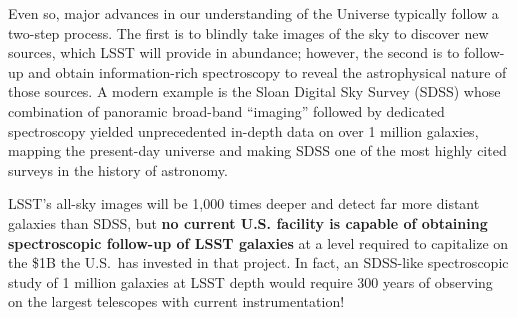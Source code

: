 \documentclass[oneside,11pt]{amsart}
\begin{document}


Even so, major advances in our understanding of the Universe typically
follow a two-step process.  The first is to blindly take images of the
sky to discover new sources, which LSST will provide in abundance;
however, the second is to follow-up and obtain information-rich
spectroscopy to reveal the astrophysical nature of those sources.  A
modern example is the Sloan Digital Sky Survey (SDSS) whose combination
of panoramic broad-band ``imaging'' followed by dedicated spectroscopy
yielded unprecedented in-depth data on over 1 million galaxies, mapping
the present-day universe and making SDSS one of the most highly cited
surveys in the history of astronomy.


LSST's all-sky images will be 1,000 times deeper and detect far more
distant galaxies than SDSS, but \textbf{no current U.S. facility is
capable of obtaining spectroscopic follow-up of LSST galaxies} at a level
required to capitalize on the \$1B the U.S.\ has invested in that
project.  In fact, an SDSS-like spectroscopic study of 1 million
galaxies at LSST depth would require 300 years of observing on the
largest telescopes with current instrumentation!  
\end{document}
